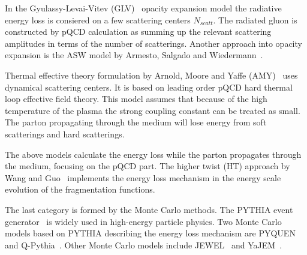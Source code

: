 In the Gyulassy-Levai-Vitev (GLV)~\cite{Gyulassy:1999zd} opacity expansion model
 the radiative energy loss is consiered on a few scattering centers $N_{scatt}$. The radiated gluon is constructed by pQCD calculation as summing up the relevant scattering amplitudes in terms of the number of scatterings. Another approach into opacity expansion is the ASW model by Armesto, Salgado and Wiedermann~\cite{Wiedemann:2000za}.

Thermal effective theory formulation by Arnold, Moore and Yaffe (AMY)~\cite{Arnold:2001ms} uses dynamical scattering centers. It is based on leading order pQCD hard thermal loop effective field theory. This model assumes that because of the high temperature of the plasma the strong coupling constant can be treated as small. The parton propagating through the medium will lose energy from soft scatterings and hard scatterings.

The above models calculate the energy loss while the parton propagates through the medium, focusing on the pQCD part. The higher twist (HT) approach by Wang and Guo~\cite{Wang:2001ifa} implements the energy loss mechanism in the energy scale evolution of the fragmentation functions.

The last category is formed by the Monte Carlo methods. The PYTHIA event generator~\cite{pythia} is widely used in high-energy particle physics. Two Monte Carlo models based on PYTHIA describing the energy loss mechanism are PYQUEN~\cite{Lokhtin:2005px} and Q-Pythia~\cite{Armesto:2009zc}. Other Monte Carlo models include JEWEL~\cite{Zapp:2008gi} and YaJEM~\cite{Renk:2009nz}. 


